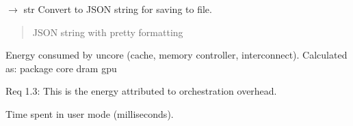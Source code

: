 \documentclass[letterpaper,10pt,english]{sphinxmanual}
\begin{document}
\begin{fulllineitems}
\begin{fulllineitems}
\label{\detokenize{core.models.energy_measurement:core.models.energy_measurement.EnergyMeasurement.to_json}}
\pysigstartsignatures
\pysiglinewithargsret
{}
{}
{{ $\rightarrow$ str}}
\pysigstopsignatures
\sphinxAtStartPar
Convert to JSON string for saving to file.
\begin{quote}\begin{description}
\sphinxAtStartPar
JSON string with pretty formatting

\end{description}\end{quote}

\end{fulllineitems}


\begin{fulllineitems}
\label{\detokenize{core.models.energy_measurement:core.models.energy_measurement.EnergyMeasurement.uncore_waste_uj}}
\pysigstartsignatures
\pysigline
{}
\pysigstopsignatures
\sphinxAtStartPar
Energy consumed by uncore (cache, memory controller, interconnect).
Calculated as: package \sphinxhyphen{} core \sphinxhyphen{} dram \sphinxhyphen{} gpu

\sphinxAtStartPar
Req 1.3: This is the energy attributed to orchestration overhead.

\end{fulllineitems}


\begin{fulllineitems}
\label{\detokenize{core.models.energy_measurement:core.models.energy_measurement.EnergyMeasurement.user_time_ms}}
\pysigstartsignatures
\pysigline
{}
\pysigstopsignatures
\sphinxAtStartPar
Time spent in user mode (milliseconds).


\end{fulllineitems}
\end{fulllineitems}
\end{document}
